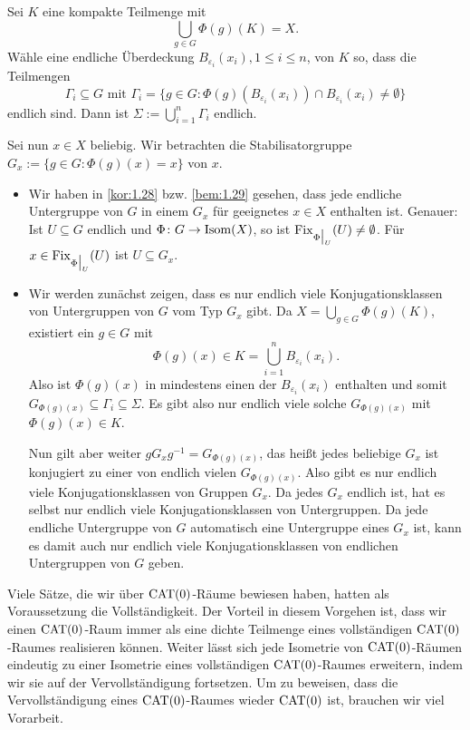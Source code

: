 \begin{beweis}
	Sei $K$ eine kompakte Teilmenge mit
	\[
		\bigcup_{g \in G} \Phi(g)(K) = X.
	\]
	Wähle eine endliche Überdeckung $B_{\varepsilon_i}(x_i), 1 \leq i \leq n$, von $K$ so, dass die Teilmengen
	\[
		\Gamma_i \subseteq G \text{ mit } \Gamma_i = \{g \in G : \Phi(g)(B_{\varepsilon_i}(x_i)) \cap B_{\varepsilon_i}(x_i) \neq \emptyset \}
	\]
	endlich sind.
	Dann ist $\Sigma := \bigcup_{i = 1}^n \Gamma_i$ endlich.
	
	Sei nun $x \in X$ beliebig.
	Wir betrachten die Stabilisatorgruppe $G_x := \{g \in G : \Phi(g)(x) = x\}$ von $x$.
	\newpage
	\begin{itemize}
		\item Wir haben in \autoref{kor:1.28} bzw. \autoref{bem:1.29} gesehen, dass jede endliche Untergruppe von $G$ in einem $G_x$ für geeignetes $x \in X$ enthalten ist.
		Genauer:
		Ist $U \subseteq G$ endlich und $\Phi \colon G \rightarrow \operatorname{Isom}(X)$, so ist $\operatorname{Fix}_{\Phi \big|_U}(U) \neq \emptyset$. Für $x \in \operatorname{Fix}_{\Phi \big|_U}(U)$ ist $U \subseteq G_x$.
		\item Wir werden zunächst zeigen, dass es nur endlich viele Konjugationsklassen von Untergruppen von $G$ vom Typ $G_x$ gibt.
		Da $X = \bigcup_{g \in G} \Phi(g)(K)$, existiert ein $g \in G$ mit 
		\[
			\Phi(g)(x) \in K = \bigcup_{i=1}^n B_{\varepsilon_i}(x_i).
		\]
		Also ist $\Phi(g)(x)$ in mindestens einen der $B_{\varepsilon_i}(x_i)$ enthalten und somit $G_{\Phi(g)(x)} \subseteq \Gamma_i \subseteq \Sigma$. Es gibt also nur endlich viele solche $G_{\Phi(g)(x)}$ mit $\Phi(g)(x) \in K$.
		
		Nun gilt aber weiter $g G_x g^{-1} = G_{\Phi(g)(x)}$, das heißt jedes beliebige $G_x$ ist konjugiert zu einer von endlich vielen $G_{\Phi(g)(x)}$.
		Also gibt es nur endlich viele Konjugationsklassen von Gruppen $G_x$.
		Da jedes $G_x$ endlich ist, hat es selbst nur endlich viele Konjugationsklassen von Untergruppen.
		Da jede endliche Untergruppe von $G$ automatisch eine Untergruppe eines $G_x$ ist, kann es damit auch nur endlich viele Konjugationsklassen von endlichen Untergruppen von $G$ geben. \qedhere
	\end{itemize}
\end{beweis}

Viele Sätze, die wir über $\operatorname{CAT(0)}$-Räume bewiesen haben, hatten als Voraussetzung die Vollständigkeit.
Der Vorteil in diesem Vorgehen ist, dass wir einen $\operatorname{CAT(0)}$-Raum immer als eine dichte Teilmenge eines vollständigen $\operatorname{CAT(0)}$-Raumes realisieren können.
Weiter lässt sich jede Isometrie von $\operatorname{CAT(0)}$-Räumen eindeutig zu einer Isometrie eines vollständigen $\operatorname{CAT(0)}$-Raumes erweitern, indem wir sie auf der Vervollständigung fortsetzen.
Um zu beweisen, dass die Vervollständigung eines $\operatorname{CAT(0)}$-Raumes wieder $\operatorname{CAT(0)}$ ist, brauchen wir viel Vorarbeit.

